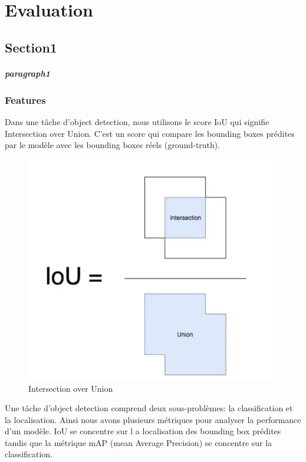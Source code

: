 \chapter{Evaluation}
\label{chap:Evaluation}

\section{Section1}
\paragraph{paragraph1}
\subsection{Features}
Dans une tâche d'object detection, nous utilisons le score IoU qui signifie Intersection over Union.
C'est un score qui compare les bounding boxes prédites par le modèle avec les bounding boxes réels (ground-truth).
\begin{figure}[tbh!]
    \centering
    \includegraphics[width=\textwidth]{images/iou.png}
    \caption{Intersection over Union}
    \label{fig:iou}
\end{figure}
Une tâche d'object detection comprend deux sous-problèmes: la classification et la localisation.
Ainsi nous avons plusieurs métriques pour analyser la performance d'un modèle. IoU se concentre sur l
a localisation des bounding box prédites tandis que la métrique mAP (mean Average Precision) 
se concentre sur la classification.

